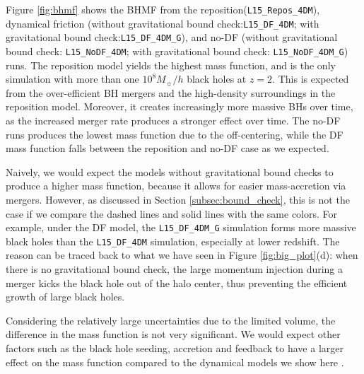 Figure \ref{fig:bhmf} shows the BHMF from the reposition(\texttt{L15\_Repos\_4DM}), dynamical friction (without gravitational bound check:\texttt{L15\_DF\_4DM}; with gravitational bound check:\texttt{L15\_DF\_4DM\_G}), and no-DF (without gravitational bound check: \texttt{L15\_NoDF\_4DM}; with gravitational bound check: \texttt{L15\_NoDF\_4DM\_G}) runs. The reposition model yields the highest mass function, and is the only simulation with more than one $10^8 M_{\sun}/h$ black holes at $z=2$. This is expected from the over-efficient BH mergers and the high-density surroundings in the reposition model. Moreover, it creates increasingly more massive BHs over time, as the increased merger rate produces a stronger effect over time. The no-DF runs produces the lowest mass function due to the off-centering, while the DF mass function falls between the reposition and no-DF case as we expected. 

Naively, we would expect the models without gravitational bound checks to produce a higher mass function, because it allows for easier mass-accretion via mergers. However, as discussed in Section \ref{subsec:bound_check}, this is not the case if we compare the dashed lines and solid lines with the same colors. For example, under the DF model, the \texttt{L15\_DF\_4DM\_G} simulation forms more massive black holes than the \texttt{L15\_DF\_4DM} simulation, especially at lower redshift. The reason can be traced back to what we have seen in Figure \ref{fig:big_plot}(d): when there is no gravitational bound check, the large momentum injection during a merger kicks the black hole out of the halo center, thus preventing the efficient growth of large black holes.

Considering the relatively large uncertainties due to the limited volume, the difference in the mass function is not very significant. We would expect other factors such as the black hole seeding, accretion and feedback to have a larger effect on the mass function compared to the dynamical models we show here \citep[e.g.][]{Booth2009}.